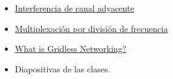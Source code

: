 \documentclass[11pt]{article}
\providecommand{\tightlist}{%
      \setlength{\itemsep}{0pt}\setlength{\parskip}{0pt}}
\begin{document}
\begin{itemize}
\tightlist
\item
  \href{https://es.wikipedia.org/wiki/Interferencia_de_canal_adyacente}{Interferencia
  de canal adyacente}
\item
  \href{https://www.monografias.com/trabajos103/multiplexacion-division-frecuencia/multiplexacion-division-frecuencia.shtml}{Multiplexación
  por división de frecuencia}
\item
  \href{https://www.ciena.com/insights/articles/What-is-Gridless-Networking_prx.html}{What
  is Gridless Networking?}
\item
  Diapositivas de las clases.
\end{itemize}


    
    
    
\end{document}
